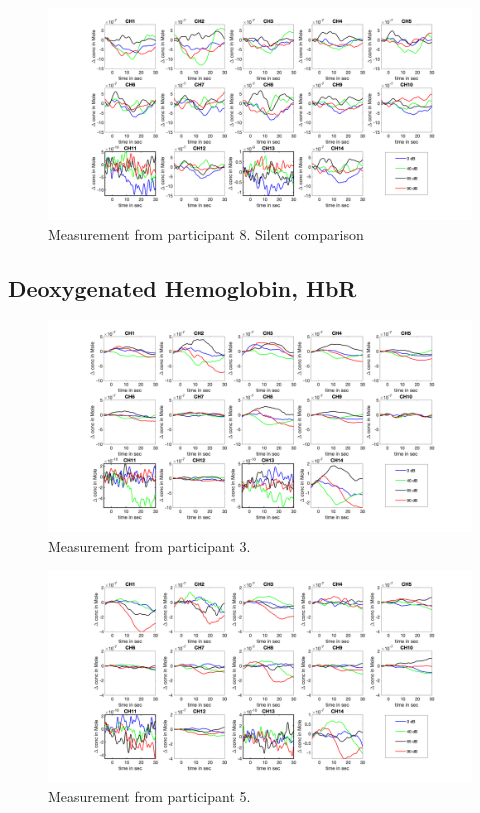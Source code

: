 \begin{figure}[H]
  \centering
    \includegraphics[scale=.4]{bilder/HbO_Mole/sub_luca2_s_HbO.png}
  \caption{Measurement from participant 8. Silent comparison}
  \label{fig:somesignal}
\end{figure}



\newpage

\subsection{Deoxygenated Hemoglobin, HbR}

\begin{figure}[H]
  \centering
    \includegraphics[scale=.4]{bilder/HbR_Mole/sub_jonas_s_HbR.png}
  \caption{Measurement from participant 3.}
  \label{fig:somesignal}
\end{figure}

\begin{figure}[H]
  \centering
    \includegraphics[scale=.4]{bilder/HbR_Mole/sub_lukas_s_HbR.png}
  \caption{Measurement from participant 5.}
  \label{fig:somesignal}
\end{figure}

